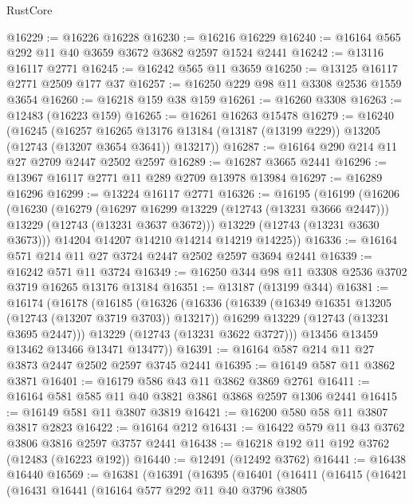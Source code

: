 \begin{lexlean}{RustCore}
\begin{coremodule}
@16229 := @16226 @16228
@16230 := @16216 @16229
@16240 := @16164 @565 @292 @11 @40 @3659 @3672 @3682 @2597 @1524 @2441
@16242 := @13116 @16117 @2771
@16245 := @16242 @565 @11 @3659
@16250 := @13125 @16117 @2771 @2509 @177 @37
@16257 := @16250 @229 @98 @11 @3308 @2536 @1559 @3654
@16260 := @16218 @159 @38 @159
@16261 := @16260 @3308
@16263 := @12483 (@16223 @159)
@16265 := @16261 @16263 @15478
@16279 := @16240
    (@16245
      (@16257
        @16265
        @13176
        @13184
        (@13187 (@13199 @229))
        @13205
        (@12743 (@13207 @3654 @3641))
        @13217))
@16287 := @16164 @290 @214 @11 @27 @2709 @2447 @2502 @2597
@16289 := @16287 @3665 @2441
@16296 := @13967 @16117 @2771 @11 @289 @2709 @13978 @13984
@16297 := @16289 @16296
@16299 := @13224 @16117 @2771
@16326 := @16195
    (@16199
      (@16206
        (@16230
          (@16279
            (@16297 @16299 @13229 (@12743 (@13231 @3666 @2447)))
            @13229
            (@12743 (@13231 @3637 @3672)))
          @13229
          (@12743 (@13231 @3630 @3673)))
        @14204
        @14207
        @14210
        @14214
        @14219
        @14225))
@16336 := @16164 @571 @214 @11 @27 @3724 @2447 @2502 @2597 @3694 @2441
@16339 := @16242 @571 @11 @3724
@16349 := @16250 @344 @98 @11 @3308 @2536 @3702 @3719 @16265 @13176 @13184
@16351 := @13187 (@13199 @344)
@16381 := @16174
    (@16178
      (@16185
        (@16326
          (@16336
            (@16339 (@16349 @16351 @13205 (@12743 (@13207 @3719 @3703)) @13217))
            @16299
            @13229
            (@12743 (@13231 @3695 @2447)))
          @13229
          (@12743 (@13231 @3622 @3727)))
        @13456
        @13459
        @13462
        @13466
        @13471
        @13477))
@16391 := @16164 @587 @214 @11 @27 @3873 @2447 @2502 @2597 @3745 @2441
@16395 := @16149 @587 @11 @3862 @3871
@16401 := @16179 @586 @43 @11 @3862 @3869 @2761
@16411 := @16164 @581 @585 @11 @40 @3821 @3861 @3868 @2597 @1306 @2441
@16415 := @16149 @581 @11 @3807 @3819
@16421 := @16200 @580 @58 @11 @3807 @3817 @2823
@16422 := @16164 @212
@16431 := @16422 @579 @11 @43 @3762 @3806 @3816 @2597 @3757 @2441
@16438 := @16218 @192 @11 @192 @3762 (@12483 (@16223 @192))
@16440 := @12491 (@12492 @3762)
@16441 := @16438 @16440
@16569 := @16381
    (@16391
      (@16395
        (@16401
          (@16411
            (@16415
              (@16421
                (@16431
                  @16441
                  (@16164
                    @577
                    @292
                    @11
                    @40
                    @3796
                    @3805

\end{coremodule}
\end{lexlean}
